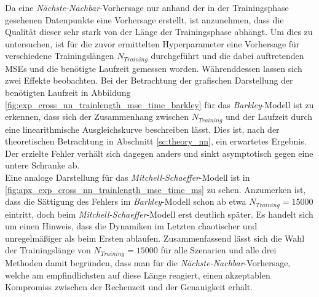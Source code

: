 Da eine \textit{Nächste-Nachbar}-Vorhersage nur anhand der in der Trainingsphase gesehenen Datenpunkte eine Vorhersage erstellt, ist anzunehmen, dass die Qualität dieser sehr stark von der Länge der Trainingsphase abhängt. Um dies zu untersuchen, ist für die zuvor ermittelten Hyperparameter eine Vorhersage für verschiedene Trainingslängen $N_{Training}$ durchgeführt und die dabei auftretenden MSEs und die benötigte Laufzeit gemessen worden. Währenddessen lassen sich zwei Effekte beobachten. Bei der Betrachtung der grafischen Darstellung der benötigten Laufzeit in Abbildung \ref{fig:exp_cross_nn_trainlength_mse_time_barkley} für das \textit{Barkley}-Modell ist zu erkennen, dass sich der Zusammenhang zwischen $N_{Training}$ und der Laufzeit durch eine linearithmische Ausgleichskurve beschreiben lässt. Dies ist, nach der theoretischen Betrachtung in Abschnitt \ref{sc:theory_nn}, ein erwartetes Ergebnis. Der erzielte Fehler verhält sich dagegen anders und sinkt asymptotisch gegen eine untere Schranke ab.\\

Eine analoge Darstellung für das \textit{Mitchell-Schaeffer}-Modell ist in \ref{fig:apx_exp_cross_nn_trainlength_mse_time_ms} zu sehen. Anzumerken ist, dass die Sättigung des Fehlers im \textit{Barkley}-Modell schon ab etwa $N_{Training}=15000$ eintritt, doch beim \textit{Mitchell-Schaeffer}-Modell erst deutlich später. Es handelt sich um einen Hinweis, dass die Dynamiken im Letzten chaotischer und unregelmäßiger als beim Ersten ablaufen. Zusammenfassend lässt sich die Wahl der Trainingslänge von $N_{Training} = 15000$ für alle Szenarien und alle drei Methoden damit begründen, dass man für die \textit{Nächste-Nachbar}-Vorhersage, welche am empfindlichsten auf diese Länge reagiert, einen akzeptablen Kompromiss zwischen der Rechenzeit und der Genauigkeit erhält.


